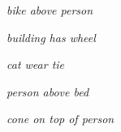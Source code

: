 \documentclass[10pt,twocolumn,letterpaper]{article}
\begin{document}
\begin{figure*}[t]
\centering
\begin{minipage}[t]{0.005\textwidth}
    	\centering
    	\vspace{0.6ex}
    \end{minipage}
    \hspace{0.01\textwidth}
	\begin{minipage}[t]{0.18\textwidth}
    	\centering
    	\emph{{\color{blue}bike} above {\color{red}person}}\\
    	\vspace{0.2ex}
	\end{minipage}
	\hspace{0.005\textwidth}
	\begin{minipage}[t]{0.18\textwidth}
    	\centering
    \emph{{\color{blue}building} has {\color{red}wheel}}\\
    	\vspace{0.2ex}
	\end{minipage}
	\hspace{0.005\textwidth}
	\begin{minipage}[t]{0.18\textwidth}
    \centering
    	\emph{{\color{blue}cat} wear {\color{red}tie}}\\
    	\vspace{0.2ex}
	\end{minipage}
	\hspace{0.005\textwidth}
	\begin{minipage}[t]{0.18\textwidth}
    \centering
    	\emph{{\color{blue}person} above {\color{red}bed}}\\
    	\vspace{0.2ex}
	\end{minipage}
	\hspace{0.005\textwidth}
	\begin{minipage}[t]{0.18\textwidth}
    \centering
    	\emph{{\color{blue}cone} on top of {\color{red}person}}\\
    	\vspace{0.2ex}
	\end{minipage}	
	

\end{figure*}
\end{document}
